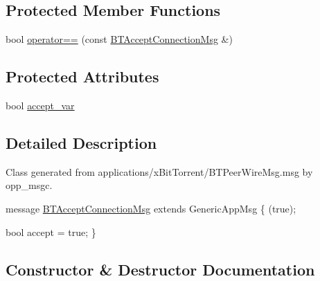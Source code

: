 \subsection*{Protected Member Functions}
\begin{DoxyCompactItemize}
\item 
bool \hyperlink{classBTAcceptConnectionMsg_a637bed52ab75fa20e02c7c99bb4a88af}{operator==} (const \hyperlink{classBTAcceptConnectionMsg}{B\+T\+Accept\+Connection\+Msg} \&)
\end{DoxyCompactItemize}
\subsection*{Protected Attributes}
\begin{DoxyCompactItemize}
\item 
bool \hyperlink{classBTAcceptConnectionMsg_ab5c783dcc784f63d070c575f46426882}{accept\+\_\+var}
\end{DoxyCompactItemize}


\subsection{Detailed Description}
Class generated from {\ttfamily applications/x\+Bit\+Torrent/\+B\+T\+Peer\+Wire\+Msg.\+msg} by opp\+\_\+msgc. 
\begin{DoxyPre}
message \hyperlink{classBTAcceptConnectionMsg}{BTAcceptConnectionMsg} extends GenericAppMsg
\{
    (true);\end{DoxyPre}



\begin{DoxyPre}    bool accept = true;
\}
\end{DoxyPre}
 

\subsection{Constructor \& Destructor Documentation}
\hypertarget{classBTAcceptConnectionMsg_add0db7db09d41c43b5ddca304d91516c}{}
